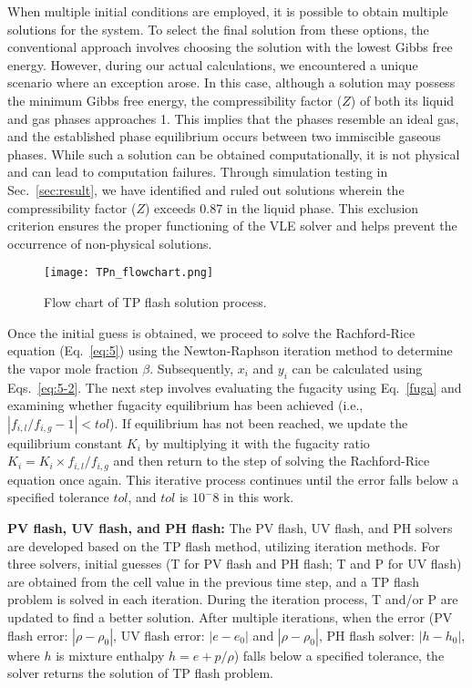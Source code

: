 {When multiple initial conditions are employed, it is possible to obtain multiple solutions for the system. To select the final solution from these options, the conventional approach involves choosing the solution with the lowest Gibbs free energy. However, during our actual calculations, we encountered a unique scenario where an exception arose. In this case, although a solution may possess the minimum Gibbs free energy, the compressibility factor ($Z$) of both its liquid and gas phases approaches 1. This implies that the phases resemble an ideal gas, and the established phase equilibrium occurs between two immiscible gaseous phases. While such a solution can be obtained computationally, it is not physical and can lead to computation failures. Through simulation testing in Sec.~\ref{sec:result}, we have identified and ruled out solutions wherein the compressibility factor ($Z$) exceeds 0.87 in the liquid phase. This exclusion criterion ensures the proper functioning of the VLE solver and helps prevent the occurrence of non-physical solutions. }

\begin{figure}[htbp]
\centering
\texttt{[image: TPn\_flowchart.png]}
\caption{Flow chart of TP flash solution process.}
\label{FC} 
\end{figure}

Once the initial guess is obtained, we proceed to solve the Rachford-Rice equation (Eq.~\ref{eq:5}) using the Newton-Raphson iteration method to determine the vapor mole fraction $\beta$. Subsequently, $x_i$ and $y_i$ can be calculated using Eqs.~\ref{eq:5-2}. The next step involves evaluating the fugacity using Eq.~\ref{fuga} and examining whether fugacity equilibrium has been achieved (i.e., $\left|f_{i,l}/f_{i,g}-1\right| < tol $). If equilibrium has not been reached, we update the equilibrium constant $K_i$ by multiplying it with the fugacity ratio $K_i=K_i \times f_{i,l}/f_{i,g}$ and then return to the step of solving the Rachford-Rice equation once again. This iterative process continues until the error falls below a specified tolerance $tol$, and $tol$ is $10^-8$ in this work. 


\textbf{PV flash, UV flash, and PH flash:}
The PV flash, UV flash, and PH solvers are developed based on the TP flash method, utilizing iteration methods. For three solvers, initial guesses (T for PV flash and PH flash; T and P for UV flash) are obtained from the cell value in the previous time step, and a TP flash problem is solved in each iteration. During the iteration process, T and/or P are updated to find a better solution. After multiple iterations, when the error (PV flash error: $|\rho - \rho_0|$, UV flash error: $|e - e_0|$ and $|\rho - \rho_0|$, PH flash solver: $|h - h_0|$, where $h$ is mixture enthalpy $h=e+p/\rho$) falls below a specified tolerance, the solver returns the solution of TP flash problem.


